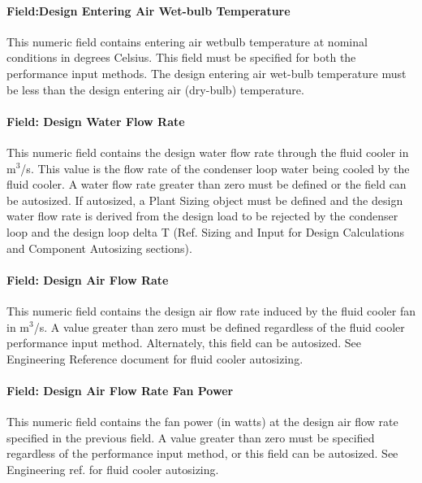 \paragraph{Field:Design Entering Air Wet-bulb Temperature}\label{fielddesign-entering-air-wet-bulb-temperature-2}

This numeric field contains entering air wetbulb temperature at nominal conditions in degrees Celsius. This field must be specified for both the performance input methods. The design entering air wet-bulb temperature must be less than the design entering air (dry-bulb) temperature.

\paragraph{Field: Design Water Flow Rate}\label{field-design-water-flow-rate-6}

This numeric field contains the design water flow rate through the fluid cooler in m\(^{3}\)/s. This value is the flow rate of the condenser loop water being cooled by the fluid cooler. A water flow rate greater than zero must be defined or the field can be autosized. If autosized, a Plant Sizing object must be defined and the design water flow rate is derived from the design load to be rejected by the condenser loop and the design loop delta T (Ref. Sizing and Input for Design Calculations and Component Autosizing sections).

\paragraph{Field: Design Air Flow Rate}\label{field-design-air-flow-rate-4}

This numeric field contains the design air flow rate induced by the fluid cooler fan in m\(^{3}\)/s. A value greater than zero must be defined regardless of the fluid cooler performance input method. Alternately, this field can be autosized. See Engineering Reference document for fluid cooler autosizing.

\paragraph{Field: Design Air Flow Rate Fan Power}\label{field-design-air-flow-rate-fan-power-1}

This numeric field contains the fan power (in watts) at the design air flow rate specified in the previous field. A value greater than zero must be specified regardless of the performance input method, or this field can be autosized. See Engineering ref. for fluid cooler autosizing.

